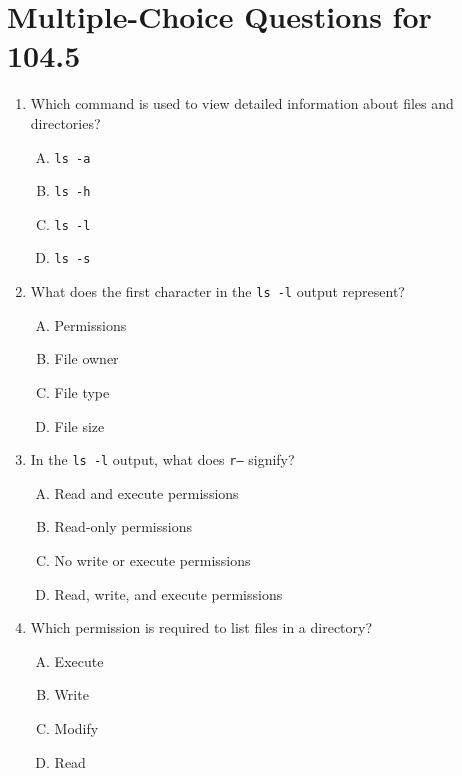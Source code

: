 \documentclass[a4paper]{report}
\begin{document}
\section*{Multiple-Choice Questions for 104.5}
\begin{enumerate}[1.]

    \item Which command is used to view detailed information about files and directories?  
    \begin{enumerate}[A)]
        \item \texttt{ls -a}  
        \item \texttt{ls -h}  
        \item \texttt{ls -l}  
        \item \texttt{ls -s}  
    \end{enumerate}

    \item What does the first character in the \texttt{ls -l} output represent?  
    \begin{enumerate}[A)]
        \item Permissions  
        \item File owner  
        \item File type  
        \item File size  
    \end{enumerate}

    \item In the \texttt{ls -l} output, what does \texttt{r--} signify?  
    \begin{enumerate}[A)]
        \item Read and execute permissions  
        \item Read-only permissions  
        \item No write or execute permissions  
        \item Read, write, and execute permissions  
    \end{enumerate}

    \item Which permission is required to list files in a directory?  
    \begin{enumerate}[A)]
        \item Execute  
        \item Write  
        \item Modify  
        \item Read  
    \end{enumerate}


\end{enumerate}
\end{document}
